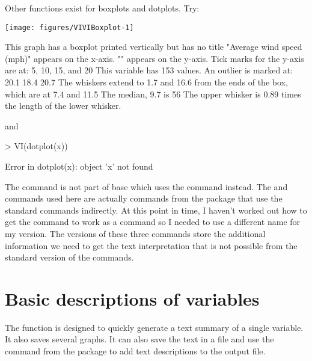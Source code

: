  
Other functions exist for boxplots and dotplots. Try: 
\begin{Schunk}

\texttt{[image: figures/VIVIBoxplot-1]} \begin{Soutput}
This graph has a boxplot printed vertically
but has no title
"Average wind speed (mph)" appears on the x-axis.
"" appears on the y-axis.
Tick marks for the y-axis are at: 5, 10, 15, and 20 
This variable  has 153 values.
An outlier is marked at: 20.1 18.4 20.7 
The whiskers extend to 1.7 and 16.6 from the ends of the box, 
which are at 7.4 and 11.5 
The median, 9.7 is 56 % from the lower end of the box to the upper end.
The upper whisker is 0.89 times the length of the lower whisker.
\end{Soutput}
\end{Schunk}
 and 
\begin{Schunk}
\begin{Sinput}
> VI(dotplot(x)) 
\end{Sinput}
\begin{Soutput}
Error in dotplot(x): object 'x' not found
\end{Soutput}
\end{Schunk}
 
The  command is not part of base \R{} which uses the  command instead. The  and  commands used here are actually commands from the  package that use the standard commands indirectly. At this point in time, I haven't worked out how to get the  command to work as a  command so I needed to use a different name for my version. The  versions of these three commands store the additional information we need to get the text interpretation that is not possible from the standard version of the commands. 
 
 
\section{Basic descriptions of variables} 
 
The  function is designed to quickly generate a text summary of a single variable. It also saves several graphs. It can also save the text in a file and use the  command from the  package to add text descriptions to the output file. 
 
